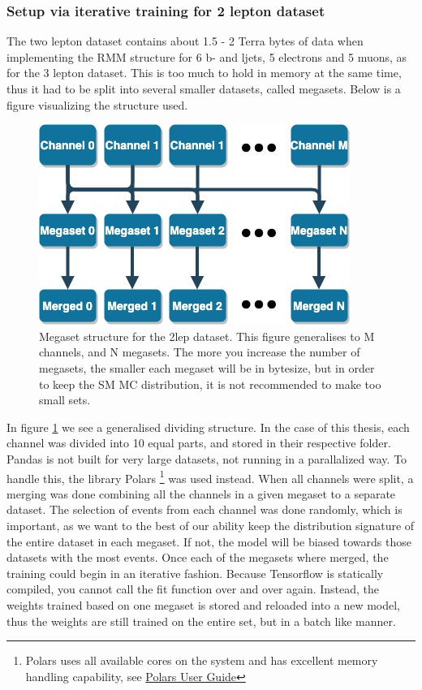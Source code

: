 \subsubsection*{Setup via iterative training for 2 lepton dataset}
The two lepton dataset contains about 1.5 - 2 Terra bytes of data when implementing the RMM structure for 6 
b- and ljets, 5 electrons and 5 muons, as for the 3 lepton dataset. This is too much to hold in memory at the same time, thus it had to 
be split into several smaller datasets, called megasets. Below is a figure visualizing the structure used. 

\begin{figure}[H]
    \centering
    \includegraphics[width=0.6\linewidth]{Figures/2lep_config/megaset_struct.jpeg}
    \caption[Megaset structure diagram]{Megaset structure for the 2lep dataset. This figure generalises to M channels, and N megasets. The more you increase the number of megasets, 
    the smaller each megaset will be in bytesize, but in order to keep the SM MC distribution, it is not recommended to make too small sets.  }
    \label{fig:2lep_struct}
\end{figure}




In figure \ref{fig:2lep_struct} we see a generalised dividing structure. In the case of this thesis, each channel was divided into 10 equal parts, 
and stored in their respective folder. Pandas is not built for very large datasets, not running in a parallalized way. To handle this, the library
Polars
\footnote{Polars uses all available cores on the system and has excellent memory handling capability, see \href{https://pola-rs.github.io/polars-book/user-guide/}{Polars User Guide}}
\cite{ritchie_vink_2023_7744139} was used instead. When all channels were split, a merging was done combining all the channels in a given 
megaset to a separate dataset. The selection of events from each channel was done randomly, 
which is important, as we want to the best of our ability keep the distribution signature of the entire dataset in each megaset. If not, the model will 
be biased towards those datasets with the most events. Once each of the megasets where merged, the training could begin in an iterative fashion. Because
Tensorflow is statically compiled, you cannot call the fit function over and over again. Instead, the weights trained based on one megaset is stored and 
reloaded into a new model, thus the weights are still trained on the entire set, but in a batch like manner. 



